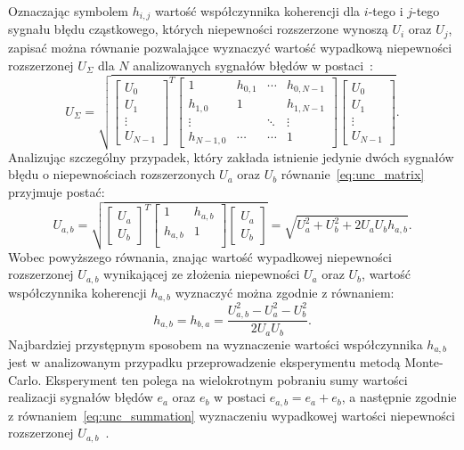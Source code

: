 Oznaczając symbolem $h_{i,j}$ wartość współczynnika koherencji dla $i$-tego i $j$-tego sygnału błędu cząstkowego, których niepewności rozszerzone wynoszą $U_{i}$ oraz $U_{j}$, zapisać można równanie pozwalające wyznaczyć wartość wypadkową niepewności rozszerzonej $U_{\Sigma}$ dla $N$ analizowanych sygnałów błędów w postaci~\cite{jakubiec_redmono}:
\begin{equation}
U_{\Sigma} = \sqrt{
\begin{bmatrix}
U_{0} \\ U_{1} \\ \vdots \\ U_{N-1}
\end{bmatrix}^{T}
\begin{bmatrix}
1         & h_{0,1} & \cdots & h_{0,N-1} \\
h_{1,0}   & 1       &        & h_{1,N-1} \\
\vdots    &         & \ddots & \vdots    \\
h_{N-1,0} & \cdots  & \cdots & 1
\end{bmatrix}
\begin{bmatrix}
U_{0} \\ U_{1} \\ \vdots \\ U_{N-1}
\end{bmatrix}}
\label{eq:unc_matrix}.
\end{equation}
Analizując szczególny przypadek, który zakłada istnienie jedynie dwóch sygnałów błędu o niepewnościach rozszerzonych $U_{a}$ oraz $U_{b}$ równanie~\eqref{eq:unc_matrix} przyjmuje postać:
\begin{equation}
U_{a,b} = \sqrt{
\begin{bmatrix}
U_{a} \\ U_{b}
\end{bmatrix}^{T}
\begin{bmatrix}
1         & h_{a,b} \\
h_{a,b}   & 1       \\
\end{bmatrix}
\begin{bmatrix}
U_{a} \\ U_{b}
\end{bmatrix}} =
\sqrt{U_{a}^{2} + U_{b}^{2} + 2 U_{a} U_{b} h_{a,b}}
\label{eq:unc_mattwo}.
\end{equation}
Wobec powyższego równania, znając wartość wypadkowej niepewności rozszerzonej $U_{a,b}$ wynikającej ze złożenia niepewności $U_{a}$ oraz $U_{b}$, wartość współczynnika koherencji $h_{a,b}$ wyznaczyć można zgodnie z równaniem:
\begin{equation}
h_{a,b} = h_{b,a} = \frac{U_{a,b}^{2} - U_{a}^{2} - U_{b}^{2}}{2 U_{a} U_{b}} \label{eq:unc_cohertwo}.
\end{equation}
Najbardziej przystępnym sposobem na wyznaczenie wartości współczynnika $h_{a,b}$ jest w analizowanym przypadku przeprowadzenie eksperymentu metodą Monte-Carlo. Eksperyment ten polega na wielokrotnym pobraniu sumy wartości realizacji sygnałów błędów $e_{a}$ oraz $e_{b}$ w postaci $e_{a,b} = e_{a} + e_{b}$, a następnie zgodnie z równaniem~\eqref{eq:unc_summation} wyznaczeniu wypadkowej wartości niepewności rozszerzonej $U_{a,b}$~\cite{jcgm_montecarlo}.

